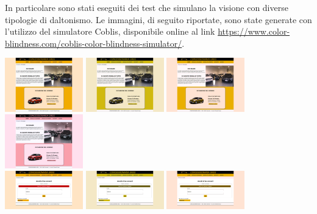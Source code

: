 In particolare sono stati eseguiti dei test che simulano la visione con diverse tipologie di daltonismo. Le immagini, di seguito riportate, sono state generate con l'utilizzo del simulatore Coblis, disponibile online al link \url{https://www.color-blindness.com/coblis-color-blindness-simulator/}.

\includegraphics[width=8pc]{./img/homepage-normal.png} \includegraphics[width=8pc]{./img/homepage-protanopia.png} \includegraphics[width=8pc]{./img/homepage-deuteranopia.png} \includegraphics[width=8pc]{./img/homepage-tritanopia.png}\\

\includegraphics[width=8pc]{./img/pagina_accesso_errore-normal.png} \includegraphics[width=8pc]{./img/pagina_accesso_errore-protanopia.png} \includegraphics[width=8pc]{./img/pagina_accesso_errore-deuteranopia.png} 